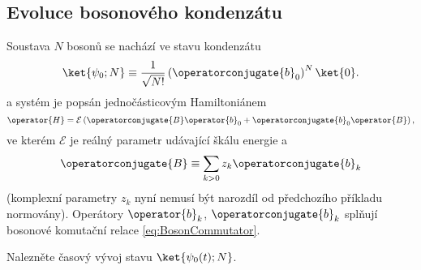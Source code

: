 \subsection{Evoluce bosonového kondenzátu}
	Soustava $N$ bosonů se nachází ve stavu kondenzátu
	\begin{equation}
		\ket{\psi_{0};N}\equiv\frac{1}{\sqrt{N!}}\left(\operatorconjugate{b}_{0}\right)^{N}\ket{0}.
	\end{equation}
	a systém je popsán jednočásticovým Hamiltoniánem
	\begin{equation}
		\operator{H}=\mathcal{E}\left(\operatorconjugate{B}\operator{b}_{0}+\operatorconjugate{b}_{0}\operator{B}\right),
	\end{equation}
	ve kterém $\mathcal{E}$ je reálný parametr udávající škálu energie a
	\begin{equation}
		\operatorconjugate{B}\equiv\sum_{k>0}z_{k}\operatorconjugate{b}_{k}
	\end{equation}
	(komplexní parametry $z_{k}$ nyní nemusí být narozdíl od předchozího příkladu normovány).
	Operátory $\operator{b}_{k}$, $\operatorconjugate{b}_{k}$ splňují bosonové komutační relace \eqref{eq:BosonCommutator}.
	
	Nalezněte časový vývoj stavu $\ket{\psi_{0}(t);N}$.

